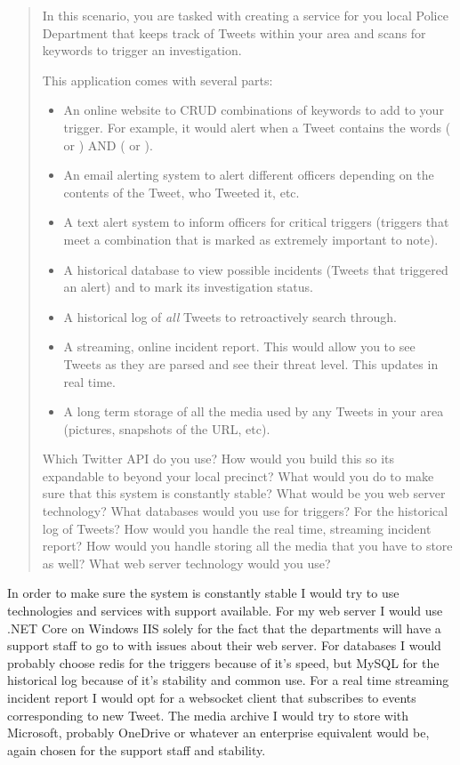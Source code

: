 \documentclass[12pt, letterpaper]{homework}
\begin{document}
\begin{quote}
    In this scenario, you are tasked with creating a service for you local Police
    Department that keeps track of Tweets within your area and scans for keywords to
    trigger an investigation.

    This application comes with several parts:
    \begin{itemize}
        \item An online website to CRUD combinations of keywords to add to your
            trigger. For example, it would alert when a Tweet contains the words
            ( or ) AND ( or
            ).
        \item An email alerting system to alert different officers depending on the
            contents of the Tweet, who Tweeted it, etc.
        \item A text alert system to inform officers for critical triggers (triggers
            that meet a combination that is marked as extremely important to note).
        \item A historical database to view possible incidents (Tweets that
            triggered an alert) and to mark its investigation status.
        \item A historical log of \textit{all} Tweets to retroactively search
            through.
        \item A streaming, online incident report. This would allow you to see
            Tweets as they are parsed and see their threat level. This updates in
            real time.
        \item A long term storage of all the media used by any Tweets in your area
            (pictures, snapshots of the URL, etc).
    \end{itemize}

    Which Twitter API do you use? How would you build this so its expandable to
    beyond your local precinct? What would you do to make sure that this system is
    constantly stable? What would be you web server technology? What databases would
    you use for triggers? For the historical log of Tweets? How would you handle the
    real time, streaming incident report? How would you handle storing all the media
    that you have to store as well? What web server technology would you use?
\end{quote}

In order to make sure the system is constantly stable I would try to use
technologies and services with support available. For my web server I would use
\@.NET Core on Windows IIS solely for the fact that the departments will have a
support staff to go to with issues about their web server. For databases I would
probably choose redis for the triggers because of it's speed, but MySQL for the
historical log because of it's stability and common use. For a real time
streaming incident report I would opt for a websocket client that subscribes to
events corresponding to new Tweet. The media archive I would try to store with
Microsoft, probably OneDrive or whatever an enterprise equivalent would be,
again chosen for the support staff and stability.
\end{document}
